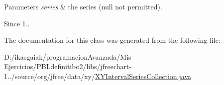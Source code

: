 \begin{DoxyParams}{Parameters}
{\em series} & the series ({\ttfamily null} not permitted).\\
\hline
\end{DoxyParams}
\begin{DoxySince}{Since}
1.. 
\end{DoxySince}


The documentation for this class was generated from the following file\+:\begin{DoxyCompactItemize}
\item 
D\+:/ikasgaiak/programacion\+Avanzada/\+Mis Ejercicios/\+P\+B\+Ldefinitibo2/libs/jfreechart-\/1../source/org/jfree/data/xy/\mbox{\hyperlink{_x_y_interval_series_collection_8java}{X\+Y\+Interval\+Series\+Collection.\+java}}\end{DoxyCompactItemize}
